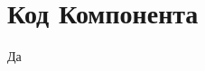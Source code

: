 \documentclass[master, och, pract]{SCWorks}
\begin{document}






\appendix


\section{Код Компонента}
Да
\end{document}

